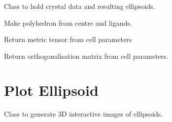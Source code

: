 \documentclass[a4paper,10pt,openany, oneside]{sphinxmanual}
\begin{document}
\begin{fulllineitems}
\label{api_reference:distellipsoid.readcoords.Crystal}
Class to hold crystal data and resulting ellipsoids.

\begin{fulllineitems}
\label{api_reference:distellipsoid.readcoords.Crystal.makepolyhedron}
Make polyhedron from centre and ligands.

\end{fulllineitems}


\begin{fulllineitems}
\label{api_reference:distellipsoid.readcoords.Crystal.mtensor}
Return metric tensor from cell parameters

\end{fulllineitems}


\begin{fulllineitems}
\label{api_reference:distellipsoid.readcoords.Crystal.orthomatrix}
Return orthogonalisation matrix from cell parameters.

\end{fulllineitems}


\end{fulllineitems}



\section{Plot Ellipsoid}
\label{api_reference:plot-ellipsoid}
Class to generate 3D interactive images of ellipsoids.
\end{document}

